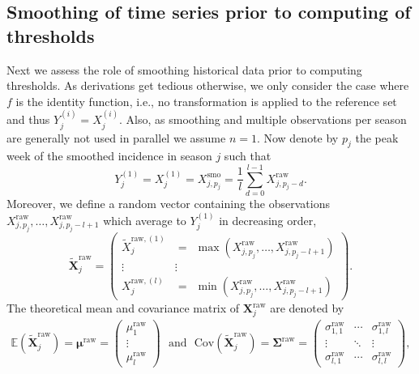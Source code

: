 \documentclass{article}
\begin{document}



\subsection{Smoothing of time series prior to computing of thresholds}
\label{subsec:smoothing}

Next we assess the role of smoothing historical data prior to computing thresholds. As derivations get tedious otherwise, we only consider the case where $f$ is the identity function, i.e., no transformation is applied to the reference set and thus $
Y^{(i)}_j = X^{(i)}_j$. Also, as smoothing and multiple observations per season are generally not used in parallel we assume $n = 1$. Now denote by $p_j$ the peak week of the smoothed incidence in season $j$ such that
\begin{equation}
Y_j^{(1)} =  X_j^{(1)} = X^{\text{smo}}_{j, p_j} = \frac{1}{l} \sum_{d = 0}^{l - 1} X^{\text{raw}}_{j, p_j - d}.\label{eq:Y_1_smoothing}
\end{equation}
Moreover, we define a random vector containing the observations $X^{\text{raw}}_{j, p_j}, \dots, X^{\text{raw}}_{j, p_j - l + 1}$ which average to $Y_j^{(1)}$ in decreasing order,
$$
\tilde{\mathbf{X}}^\text{raw}_j = \begin{pmatrix} \tilde{X}_j^{\text{raw}, (1)} & = \ \ \max(X^{\text{raw}}_{j, p_j}, \dots, X^{\text{raw}}_{j, p_j - l + 1}) \\ \vdots & \vdots \\ X_j^{\text{raw}, (l)} & = \ \ \min(X^{\text{raw}}_{j, p_j}, \dots, X^{\text{raw}}_{j, p_j - l + 1}) \end{pmatrix}.
$$
The theoretical mean and covariance matrix of $\mathbf{X}^\text{raw}_j$ are denoted by
\begin{align}
\mathbb{E}\left(\tilde{\mathbf{X}}^\text{raw}_j\right) = \boldsymbol{\mu}^\text{raw} = \left(\begin{array}{c}
\mu^\text{raw}_1\\
\vdots\\
\mu^\text{raw}_l
\end{array}\right) \ \ \ \text{and} \ \ \ \text{Cov}\left(\tilde{\mathbf{X}}^\text{raw}_j\right) = \boldsymbol{\Sigma}^\text{raw} =
\left(\begin{array}{ccc}
\sigma^\text{raw}_{1, 1} & \cdots & \sigma^\text{raw}_{1, l}\\
\vdots & \ddots &\vdots\\
\sigma^\text{raw}_{l, 1} & \cdots & \sigma^\text{raw}_{l, l}
\end{array}\right),
\end{align}
\end{document}
